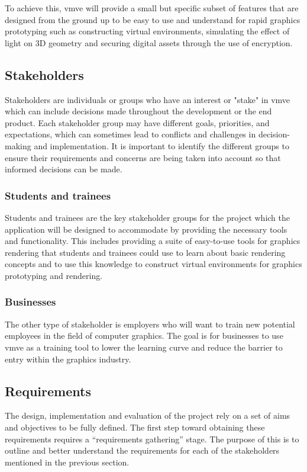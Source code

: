 \documentclass[11pt]{article}
\begin{document}
To achieve this, \gls*{vmve} will provide a small but specific subset of
features that are designed from the ground up to be easy to use and understand
for rapid graphics prototyping such as constructing virtual environments,
simulating the effect of light on 3D geometry and securing digital assets
through the use of encryption.

\subsection{Stakeholders}
Stakeholders are individuals or groups who have an interest or "stake" in
\gls*{vmve} which can include decisions made throughout the development or the
end product. Each stakeholder group may have different goals, priorities, and
expectations, which can sometimes lead to conflicts and challenges in
decision-making and implementation. It is important to identify the different
groups to ensure their requirements and concerns are being taken into account so
that informed decisions can be made.

\subsubsection{Students and trainees}
Students and trainees are the key stakeholder groups for the project which the
application will be designed to accommodate by providing the necessary tools and
functionality. This includes providing a suite of easy-to-use tools for graphics
rendering that students and trainees could use to learn about basic rendering
concepts and to use this knowledge to construct virtual environments for
graphics prototyping and rendering.

\subsubsection{Businesses}
The other type of stakeholder is employers who will want to train new potential
employees in the field of computer graphics. The goal is for businesses to use
\gls*{vmve} as a training tool to lower the learning curve and reduce the
barrier to entry within the graphics industry.

\subsection{Requirements}
The design, implementation and evaluation of the project rely on a set of aims
and objectives to be fully defined. The first step toward obtaining these
requirements requires a ``requirements gathering'' stage. The purpose of this
is to outline and better understand the requirements for each of the
stakeholders mentioned in the previous section.
\end{document}
